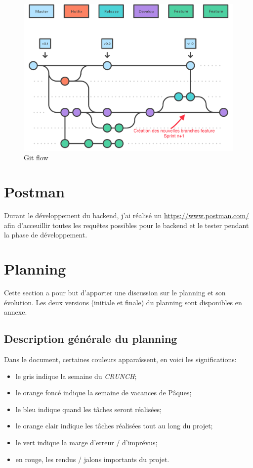 \documentclass[
    iai, %
    il, %
]{heig-tb}
\begin{document}
\begin{center}
    \begin{figure}
        \includegraphics[width=\textwidth]{./assets/figures/git-flow.png}
        \caption{Git flow \label{git-flow}}
    \end{figure}
\end{center}

\section{Postman}
Durant le développement du \Gls{backend}, j'ai réalisé un \href{Postman collaboratif}{https://www.postman.com/} afin d'acceuillir toutes les requêtes possibles pour le \Gls{backend} et le tester pendant la phase de développement.



\section{Planning}
Cette section a pour but d'apporter une discussion sur le planning et son évolution.
Les deux versions (initiale et finale) du planning sont disponibles en annexe.

\subsection{Description générale du planning}

Dans le document, certaines couleurs apparaîssent, en voici les significations:
\begin{itemize}
    \item le gris indique la semaine du \emph{CRUNCH};
    \item le orange foncé indique la semaine de vacances de Pâques;
    \item le bleu indique quand les tâches seront réalisées;
    \item le orange clair indique les tâches réalisées tout au long du projet;
    \item le vert indique la marge d'erreur / d'imprévus;
    \item en rouge, les rendus / jalons importants du projet.
\end{itemize}
\end{document}
